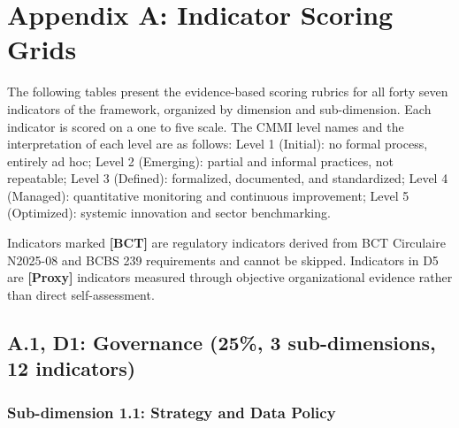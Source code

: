 
\setlength{\arrayrulewidth}{0.5pt}
\renewcommand{\arraystretch}{1.3}
\setlength{\tabcolsep}{4pt}
\section*{Appendix A: Indicator Scoring Grids}

The following tables present the evidence-based scoring rubrics for all forty seven indicators of the framework, organized by dimension and sub-dimension. Each indicator is scored on a one to five scale. The CMMI level names and the interpretation of each level are as follows: Level 1 (Initial): no formal process, entirely ad hoc; Level 2 (Emerging): partial and informal practices, not repeatable; Level 3 (Defined): formalized, documented, and standardized; Level 4 (Managed): quantitative monitoring and continuous improvement; Level 5 (Optimized): systemic innovation and sector benchmarking.

\vspace{0.5em}
\noindent Indicators marked \textbf{[BCT]} are regulatory indicators derived from BCT Circulaire N\textdegree{}2025-08 and BCBS 239 requirements and cannot be skipped. Indicators in D5 are \textbf{[Proxy]} indicators measured through objective organizational evidence rather than direct self-assessment.


\subsection*{A.1, D1: Governance (25\%, 3 sub-dimensions, 12 indicators)}

\subsubsection*{Sub-dimension 1.1: Strategy and Data Policy}

